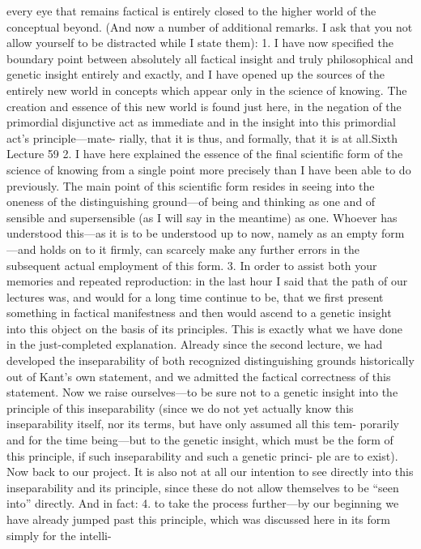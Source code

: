 every eye that remains factical is entirely closed to the higher world of the
conceptual beyond.
(And now a number of additional remarks. I ask that you not allow
yourself to be distracted while I state them):
1. I have now specified the boundary point between absolutely all factical
insight and truly philosophical and genetic insight entirely and exactly, and
I have opened up the sources of the entirely new world in concepts which
appear only in the science of knowing. The creation and essence of this new
world is found just here, in the negation of the primordial disjunctive act
as immediate and in the insight into this primordial act’s principle—mate-
rially, that it is thus, and formally, that it is at all.Sixth Lecture
59
2. I have here explained the essence of the final scientific form of the science
of knowing from a single point more precisely than I have been able to do
previously. The main point of this scientific form resides in seeing into the
oneness of the distinguishing ground—of being and thinking as one and of
sensible and supersensible (as I will say in the meantime) as one. Whoever
has understood this—as it is to be understood up to now, namely as an
empty form—and holds on to it firmly, can scarcely make any further errors
in the subsequent actual employment of this form.
3. In order to assist both your memories and repeated reproduction: in the
last hour I said that the path of our lectures was, and would for a long time
continue to be, that we first present something in factical manifestness
and then would ascend to a genetic insight into this object on the basis of
its principles. This is exactly what we have done in the just-completed
explanation. Already since the second lecture, we had developed the
inseparability of both recognized distinguishing grounds historically out
of Kant’s own statement, and we admitted the factical correctness of this
statement. Now we raise ourselves—to be sure not to a genetic insight
into the principle of this inseparability (since we do not yet actually know
this inseparability itself, nor its terms, but have only assumed all this tem-
porarily and for the time being—but to the genetic insight, which must be
the form of this principle, if such inseparability and such a genetic princi-
ple are to exist).
Now back to our project. It is also not at all our intention to see directly
into this inseparability and its principle, since these do not allow themselves
to be “seen into” directly. And in fact:
4. to take the process further—by our beginning we have already jumped past
this principle, which was discussed here in its form simply for the intelli-
